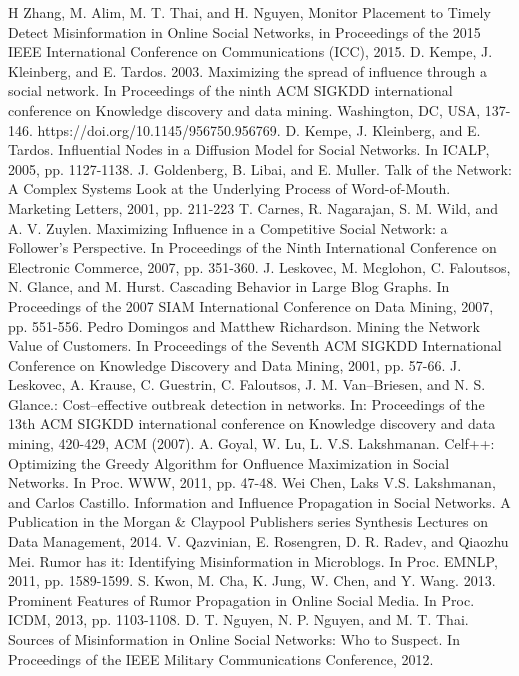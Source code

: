 \begin{thebibliography}{4}
	 H Zhang, M. Alim, M. T. Thai, and H. Nguyen, Monitor Placement to Timely Detect Misinformation in Online Social Networks, in Proceedings of the 2015 IEEE International Conference on Communications (ICC), 2015.
	 D. Kempe, J. Kleinberg, and E. Tardos. 2003. Maximizing the spread of influence through a social network. In Proceedings of the ninth ACM SIGKDD international conference on Knowledge discovery and data mining. Washington, DC, USA, 137-146. https://doi.org/10.1145/956750.956769. 
	 D. Kempe, J. Kleinberg, and E. Tardos. Influential Nodes in a Diffusion Model for Social Networks. In ICALP, 2005, pp. 1127-1138.
	 J. Goldenberg, B. Libai, and E. Muller. Talk of the Network: A Complex Systems Look at the Underlying Process of Word-of-Mouth. Marketing Letters, 2001, pp. 211-223
	 T. Carnes, R. Nagarajan, S. M. Wild, and A. V. Zuylen. Maximizing Influence in a Competitive Social Network: a Follower’s Perspective. In Proceedings of the Ninth International Conference on Electronic Commerce, 2007, pp. 351-360.
	 J. Leskovec, M. Mcglohon, C. Faloutsos, N. Glance, and M. Hurst. Cascading Behavior in Large Blog Graphs. In Proceedings of the 2007 SIAM International Conference on Data Mining, 2007, pp. 551-556.
	 Pedro Domingos and Matthew Richardson. Mining the Network Value of Customers. In Proceedings of the Seventh ACM SIGKDD International Conference on Knowledge Discovery and Data Mining, 2001, pp. 57-66.
	 J. Leskovec, A. Krause, C. Guestrin, C. Faloutsos, J. M. Van–Briesen, and N. S. Glance.: Cost–effective outbreak detection in networks. In: Proceedings of the 13th ACM SIGKDD international conference on Knowledge discovery and data mining, 420-429, ACM (2007).
	 A. Goyal, W. Lu, L. V.S. Lakshmanan. Celf++: Optimizing the Greedy Algorithm for Onfluence Maximization in Social Networks. In Proc. WWW, 2011, pp. 47-48.
	 Wei Chen, Laks V.S. Lakshmanan, and Carlos Castillo. Information and Influence Propagation in Social Networks. A Publication in the Morgan \& Claypool Publishers series Synthesis Lectures on Data Management, 2014.
	 V. Qazvinian, E. Rosengren, D. R. Radev, and Qiaozhu Mei. Rumor has it: Identifying Misinformation in Microblogs. In Proc. EMNLP, 2011, pp. 1589-1599.
	 S. Kwon, M. Cha, K. Jung, W. Chen, and Y. Wang. 2013. Prominent Features of Rumor Propagation in Online Social Media. In Proc. ICDM, 2013, pp. 1103-1108.
	 D. T. Nguyen, N. P. Nguyen, and M. T. Thai. Sources of Misinformation in Online Social Networks: Who to Suspect. In Proceedings of the IEEE Military Communications Conference, 2012.

\end{thebibliography}
